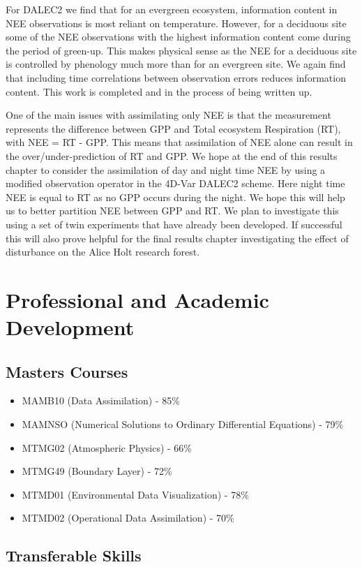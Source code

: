 \documentclass[11pt]{article}
\begin{document}
For DALEC2 we find that for an evergreen ecosystem, information content in NEE observations is most reliant on temperature. However, for a deciduous site some of the NEE observations with the highest information content come during the period of green-up. This makes physical sense as the NEE for a deciduous site is controlled by phenology much more than for an evergreen site. We again find that including time correlations between observation errors reduces information content. This work is completed and in the process of being written up.

One of the main issues with assimilating only NEE is that the measurement represents the difference between GPP and Total ecosystem Respiration (RT), with NEE = RT - GPP. This means that assimilation of NEE alone can result in the over/under-prediction of RT and GPP. We hope at the end of this results chapter to consider the assimilation of day and night time NEE by using a modified observation operator in the 4D-Var DALEC2 scheme. Here night time NEE is equal to RT as no GPP occurs during the night. We hope this will help us to better partition NEE between GPP and RT. We plan to investigate this using a set of twin experiments that have already been developed. If successful this will also prove helpful for the final results chapter investigating the effect of disturbance on the Alice Holt research forest.   

\section{Professional and Academic Development}

\subsection{Masters Courses}
\begin{itemize}
\item MAMB10 (Data Assimilation) - 85\%
\item MAMNSO (Numerical Solutions to Ordinary Differential Equations) - 79\%
\item MTMG02 (Atmospheric Physics) - 66\%
\item MTMG49 (Boundary Layer) - 72\%
\item MTMD01 (Environmental Data Visualization) - 78\%
\item MTMD02 (Operational Data Assimilation) - 70\%
\end{itemize}

\subsection{Transferable Skills}
\end{document}
